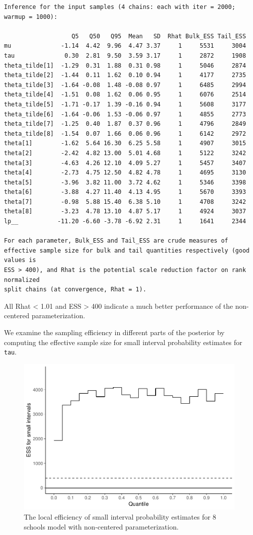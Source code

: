 \documentclass[american,]{article}
\begin{document}
\begin{verbatim}
Inference for the input samples (4 chains: each with iter = 2000; warmup = 1000):

                   Q5   Q50   Q95  Mean   SD  Rhat Bulk_ESS Tail_ESS
mu              -1.14  4.42  9.96  4.47 3.37     1     5531     3004
tau              0.30  2.81  9.50  3.59 3.17     1     2872     1908
theta_tilde[1]  -1.29  0.31  1.88  0.31 0.98     1     5046     2874
theta_tilde[2]  -1.44  0.11  1.62  0.10 0.94     1     4177     2735
theta_tilde[3]  -1.64 -0.08  1.48 -0.08 0.97     1     6485     2994
theta_tilde[4]  -1.51  0.08  1.62  0.06 0.95     1     6076     2514
theta_tilde[5]  -1.71 -0.17  1.39 -0.16 0.94     1     5608     3177
theta_tilde[6]  -1.64 -0.06  1.53 -0.06 0.97     1     4855     2773
theta_tilde[7]  -1.25  0.40  1.87  0.37 0.96     1     4796     2849
theta_tilde[8]  -1.54  0.07  1.66  0.06 0.96     1     6142     2972
theta[1]        -1.62  5.64 16.30  6.25 5.58     1     4907     3015
theta[2]        -2.42  4.82 13.00  5.01 4.68     1     5122     3242
theta[3]        -4.63  4.26 12.10  4.09 5.27     1     5457     3407
theta[4]        -2.73  4.75 12.50  4.82 4.78     1     4695     3130
theta[5]        -3.96  3.82 11.00  3.72 4.62     1     5346     3398
theta[6]        -3.88  4.27 11.40  4.13 4.95     1     5670     3393
theta[7]        -0.98  5.88 15.40  6.38 5.10     1     4708     3242
theta[8]        -3.23  4.78 13.10  4.87 5.17     1     4924     3037
lp__           -11.20 -6.60 -3.78 -6.92 2.31     1     1641     2344

For each parameter, Bulk_ESS and Tail_ESS are crude measures of 
effective sample size for bulk and tail quantities respectively (good values is 
ESS > 400), and Rhat is the potential scale reduction factor on rank normalized
split chains (at convergence, Rhat = 1).
\end{verbatim}

All Rhat \textless{} 1.01 and ESS \textgreater{} 400 indicate a much
better performance of the non-centered parameterization.

We examine the sampling efficiency in different parts of the posterior
by computing the effective sample size for small interval probability
estimates for \texttt{tau}.

\begin{figure}[tp]
  \centering
  \includegraphics[width=0.6\linewidth]{graphics/local-ess-fit-ncp2-1.pdf}
  \caption{The local efficiency of small interval probability estimates for 8 schools model with non-centered parameterization.}
\end{figure}
\end{document}
